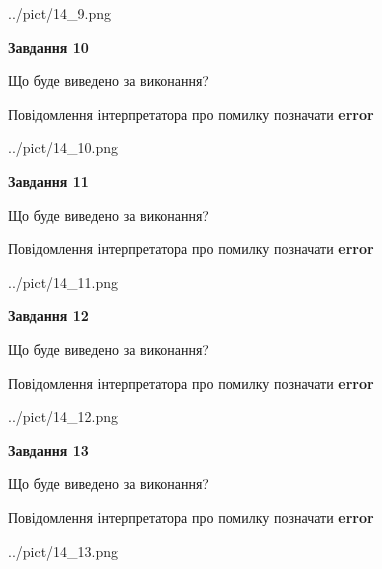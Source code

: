 \documentclass[11pt, ukrainian]{article}
\begin{document}
{\begin {large}
\begin{center}
	{../pict/14_9.png}
\end{center}
\newpage

{\begin {center}\textbf{Завдання 10}\end {center}}\par
Що буде виведено за виконання? \par
Повідомлення інтерпретатора про помилку позначати \textbf{error}

\begin{center}
	{../pict/14_10.png}
\end{center}
\newpage

{\begin {center}\textbf{Завдання 11}\end {center}}\par
Що буде виведено за виконання? \par
Повідомлення інтерпретатора про помилку позначати \textbf{error}

\begin{center}
	{../pict/14_11.png}
\end{center}
\newpage

{\begin {center}\textbf{Завдання 12}\end {center}}\par
Що буде виведено за виконання? \par
Повідомлення інтерпретатора про помилку позначати \textbf{error}

\begin{center}
	{../pict/14_12.png}
\end{center}
\newpage

{\begin {center}\textbf{Завдання 13}\end {center}}\par
Що буде виведено за виконання? \par
Повідомлення інтерпретатора про помилку позначати \textbf{error}

\begin{center}
	{../pict/14_13.png}
\end{center}
\newpage


\end{large}}
\end{document}
